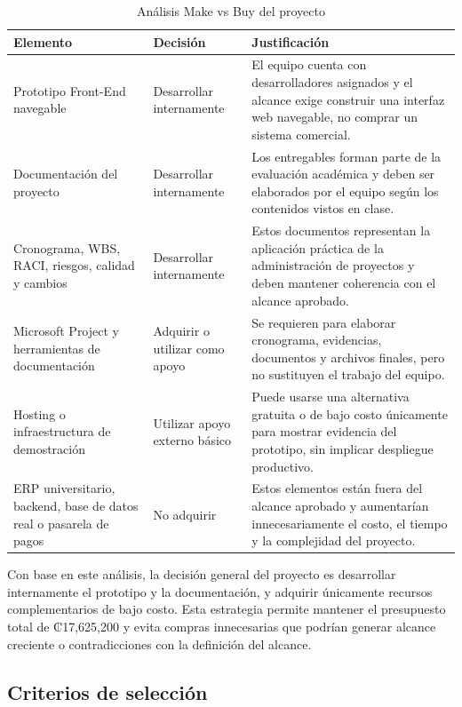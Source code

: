 \documentclass[11pt,spanish]{article}
\begin{document}
\begin{table}[H]
\centering
\caption{Análisis Make vs Buy del proyecto}
\label{tab:make-buy}
{\small
\begin{tabularx}{\textwidth}{p{4cm} p{3cm} Y}
\toprule
\textbf{Elemento} & \textbf{Decisión} & \textbf{Justificación} \\
\midrule
Prototipo Front-End navegable & Desarrollar internamente & El equipo cuenta con desarrolladores asignados y el alcance exige construir una interfaz web navegable, no comprar un sistema comercial. \\
Documentación del proyecto & Desarrollar internamente & Los entregables forman parte de la evaluación académica y deben ser elaborados por el equipo según los contenidos vistos en clase. \\
Cronograma, WBS, RACI, riesgos, calidad y cambios & Desarrollar internamente & Estos documentos representan la aplicación práctica de la administración de proyectos y deben mantener coherencia con el alcance aprobado. \\
Microsoft Project y herramientas de documentación & Adquirir o utilizar como apoyo & Se requieren para elaborar cronograma, evidencias, documentos y archivos finales, pero no sustituyen el trabajo del equipo. \\
Hosting o infraestructura de demostración & Utilizar apoyo externo básico & Puede usarse una alternativa gratuita o de bajo costo únicamente para mostrar evidencia del prototipo, sin implicar despliegue productivo. \\
ERP universitario, backend, base de datos real o pasarela de pagos & No adquirir & Estos elementos están fuera del alcance aprobado y aumentarían innecesariamente el costo, el tiempo y la complejidad del proyecto. \\
\bottomrule
\end{tabularx}
}
\end{table}

Con base en este análisis, la decisión general del proyecto es desarrollar internamente el prototipo y la documentación, y adquirir únicamente recursos complementarios de bajo costo. Esta estrategia permite mantener el presupuesto total de ₡17,625,200 y evita compras innecesarias que podrían generar alcance creciente o contradicciones con la definición del alcance.


\subsection{Criterios de selección}
\end{document}
